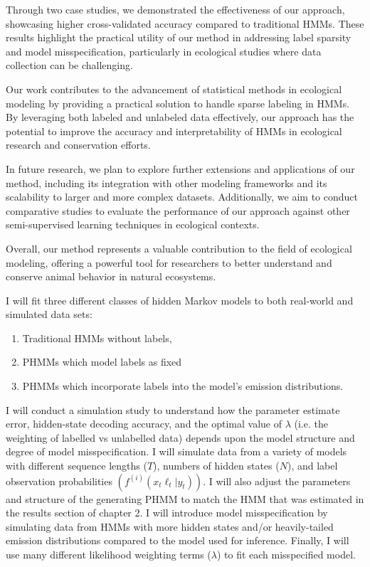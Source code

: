 Through two case studies, we demonstrated the effectiveness of our approach, showcasing higher cross-validated accuracy compared to traditional HMMs. These results highlight the practical utility of our method in addressing label sparsity and model misspecification, particularly in ecological studies where data collection can be challenging.

Our work contributes to the advancement of statistical methods in ecological modeling by providing a practical solution to handle sparse labeling in HMMs. By leveraging both labeled and unlabeled data effectively, our approach has the potential to improve the accuracy and interpretability of HMMs in ecological research and conservation efforts.

In future research, we plan to explore further extensions and applications of our method, including its integration with other modeling frameworks and its scalability to larger and more complex datasets. Additionally, we aim to conduct comparative studies to evaluate the performance of our approach against other semi-supervised learning techniques in ecological contexts.

Overall, our method represents a valuable contribution to the field of ecological modeling, offering a powerful tool for researchers to better understand and conserve animal behavior in natural ecosystems.



I will fit three different classes of hidden Markov models to both real-world and simulated data sets:

\begin{enumerate}
    \item Traditional HMMs without labels,
    \item PHMMs which model labels as fixed
    \item PHMMs which incorporate labels into the model's emission distributions.
\end{enumerate}


I will conduct a simulation study to understand how the parameter estimate error, hidden-state decoding accuracy, and the optimal value of $\lambda$ (i.e. the weighting of labelled vs unlabelled data) depends upon the model structure and degree of model misspecification. I will simulate data from a variety of models with different sequence lengths ($T$), numbers of hidden states ($N$), and label observation probabilities $\left(f^{(i)}(x_t\ell_t|y_t)\right)$. I will also adjust the parameters and structure of the generating PHMM to match the HMM that was estimated in the results section of chapter 2. I will introduce model misspecification by simulating data from HMMs with more hidden states and/or heavily-tailed emission distributions compared to the model used for inference. Finally, I will use many different likelihood weighting terms ($\lambda$) to fit each misspecified model.

